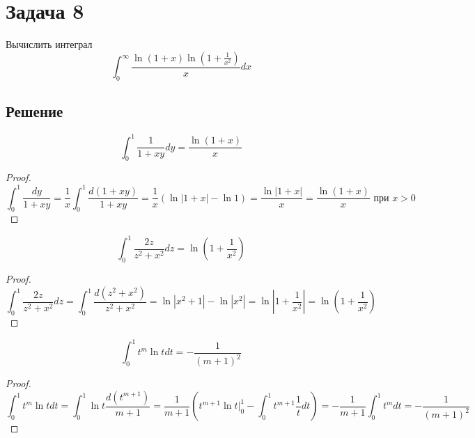 \documentclass[11pt]{article}
\def\zall{\setcounter{lem}{0}\setcounter{cnsqnc}{0}\setcounter{th}{0}\setcounter{Cmt}{0}\setcounter{equation}{0}}
\newcounter{lem}\setcounter{lem}{0}
\def\lm{\par\smallskip\refstepcounter{lem}\textbf{\arabic{lem}}}
\newtheorem*{Lemma}{Лемма \lm}
\newcounter{th}\setcounter{th}{0}
\newcounter{cnsqnc}\setcounter{cnsqnc}{0}
\newcounter{Cmt}\setcounter{Cmt}{0}
\begin{document}
\section{Задача 8}
\label{sec:org45e826e}
\zall
Вычислить интеграл
\begin{equation}\label{eq:eq8}
\int_0^{\infty}\frac{\ln(1 + x)\ln(1 + \frac1{x^2})}xdx
\end{equation}
\subsection{Решение}
\label{sec:orge5acfb2}
\begin{Lemma}\label{lem:8-1}
\begin{equation}\label{eq:lem8-1-eq}
\int_0^1\frac1{1 + xy}dy = \frac{\ln(1 + x)}x
\end{equation}
\end{Lemma}
\begin{proof}
\begin{equation*}
\int_0^1\frac{dy}{1 + xy} = \frac1x\int_0^1\frac{d(1 + xy)}{1 + xy} = \frac1x(\ln|1 + x| - \ln 1) = \frac{\ln|1 + x|}x = \frac{\ln(1 + x)}x \text{ при } x > 0
\end{equation*}
\end{proof}
\begin{Lemma}\label{lem:8-2}
\begin{equation}\label{eq:lem8-2-eq}
\int_0^1\frac{2z}{z^2 + x^2}dz = \ln\left(1 + \frac1{x^2}\right)
\end{equation}
\end{Lemma}
\begin{proof}
\begin{equation*}
\int_0^1\frac{2z}{z^2 + x^2}dz = \int_0^1\frac{d(z^2 + x^2)}{z^2 + x^2} = \ln|x^2 + 1| - \ln|x^2| = \ln\left|1 + \frac1{x^2}\right| = \ln\left(1 + \frac1{x^2}\right)
\end{equation*}
\end{proof}
\begin{Lemma}\label{lem:8-3}
\begin{equation}\label{eq:lem8-3-eq}
\int_0^1t^m\ln tdt = -\frac1{(m + 1)^2}
\end{equation}
\end{Lemma}
\begin{proof}
\begin{equation*}
\int_0^1t^m\ln tdt = \int_0^1\ln t\frac{d(t^{m + 1})}{m + 1} = \frac1{m + 1}\left(t^{m + 1}\ln t\bigg|_0^1 - \int_0^1t^{m + 1}\frac1tdt\right) = -\frac1{m + 1}\int_0^1t^mdt = -\frac1{(m + 1)^2}
\end{equation*}
\end{proof}
\end{document}
